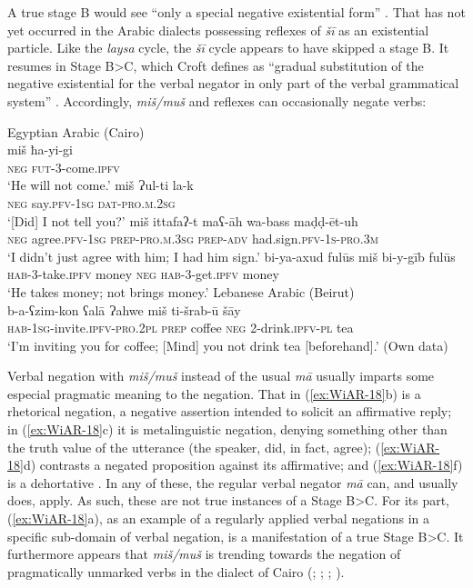 \documentclass[output=paper]{langsci/langscibook}
\begin{document}
A true stage B would see “only a special negative existential form” \citep[9]{Croft1991}. That has not yet occurred in the Arabic dialects possessing reflexes of \textit{šī} as an existential particle. Like the \textit{laysa} cycle, the \textit{šī} cycle appears to have skipped a stage B. It resumes in Stage B>C, which Croft defines as “gradual substitution of the negative existential for the verbal negator in only part of the verbal grammatical system” \citeyearpar[10]{Croft1991}. Accordingly, \textit{miš/muš} and reflexes can occasionally negate verbs:

\ea Egyptian Arabic (Cairo) \label{ex:WiAR-18}\\
  \ea
  	\gll miš ħa-yi-gi\\
  	\textsc{neg} \textsc{fut-3}-come.\textsc{ipfv}\\
  	\glt ‘He will not come.’ \citep[87]{doss2008a}
  \ex
  	\gll miš Ɂul-ti la-k\\
  	\textsc{neg} say.\textsc{pfv-1sg} \textsc{dat-pro.m.2sg}\\
    \glt ‘[Did] I not tell you?’ \citep[87]{doss2008a}
  \ex
  	\gll miš ittafaʔ-t maʕ-āh wa-bass maḍḍ-ēt-uh\\
  	\textsc{neg} agree.\textsc{pfv-1sg} \textsc{prep-pro.m.3sg} \textsc{prep-adv} had.sign.\textsc{pfv-1s-pro.3m}\\
    \glt ‘I didn’t just agree with him; I had him sign.’ \citep[86]{doss2008a}
  \ex
  	\gll bi-ya-axud fulūs miš bi-y-gīb fulūs\\
  	\textsc{hab-3}-take.\textsc{ipfv} money \textsc{neg} \textsc{hab-3}-get.\textsc{ipfv} money\\
    \glt ‘He takes money; not brings money.’ \citep[248]{al-sayyed2017a}
  \ex Lebanese Arabic (Beirut)\\
  	\gll b-a-ʕzim-kon ʕalā Ɂahwe miš ti-šrab-ū šāy\\
  	\textsc{hab-1sg}-invite.\textsc{ipfv-pro.2pl} \textsc{prep} coffee \textsc{neg} 2-drink.\textsc{ipfv-pl} tea\\
  	\glt ‘I’m inviting you for coffee; [Mind] you not drink tea [beforehand].’ (Own data)
\z \z

Verbal negation with \textit{miš/muš} instead of the usual \textit{mā} usually imparts some especial pragmatic meaning to the negation. That in (\ref{ex:WiAR-18}b) is a rhetorical negation, a negative assertion intended to solicit an affirmative reply; in (\ref{ex:WiAR-18}c) it is metalinguistic negation, denying something other than the truth value of the utterance (the speaker, did, in fact, agree); (\ref{ex:WiAR-18}d) contrasts a negated proposition against its affirmative; and (\ref{ex:WiAR-18}f) is a dehortative \citep{wilmsen2016b}. In any of these, the regular verbal negator \textit{mā} can, and usually does, apply. As such, these are not true instances of a Stage B>C. For its part, (\ref{ex:WiAR-18}a), as an example of a regularly applied verbal negations in a specific sub-domain of verbal negation, is a manifestation of a true Stage B>C. It furthermore appears that \textit{miš/muš} is trending towards the negation of pragmatically unmarked verbs in the dialect of Cairo (\citealp[303]{brustad2000a}; \citealp{doss2008a}; \citealp{h2011a}; \citealp[519]{wilmsen2020a}).
\end{document}
